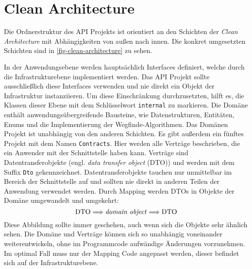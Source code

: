 \part{Clean Architecture}
Die Ordnerstruktur des API Projekts ist orientiert an den Schichten
der \textit{Clean Architecture}
mit Abhän\-gigkeiten von außen nach innen. Die konkret umgesetzten Schichten
sind in \autoref{fig-clean-architecture} zu sehen.



\noindent
In der Anwendungsebene werden hauptsächlich Interfaces definiert, welche
durch die Infrastrukturebene implementiert werden. Das API Projekt
sollte ausschließlich diese Interfaces verwenden und nie direkt
ein Objekt der Infrastruktur instanziieren.
Um diese Einschränkung durchzusetzten, hilft es,
die Klassen dieser Ebene mit dem Schlüsselwort \texttt{internal} zu markieren.
Die Domäne enthält anwendungsübergreifende Bausteine, wie
Datenstrukturen, Entitäten, Enums und die Implementierung der Wegfinde-Algorith\-men.
Das Domänen Projekt ist unabhängig von den anderen Schichten.
Es gibt außerdem ein fünftes Projekt mit dem Namen \texttt{Contracts}. Hier
werden alle Verträge beschrieben, die ein Anwender mit der Schnittstelle
haben kann. Verträge sind Datentransferobjekte (engl. \textit{data transfer object} (DTO))
und werden mit dem Suffix \texttt{Dto} gekennzeichnet. Datentransferobjekte
tauchen nur unmittelbar im Bereich der Schnittstelle auf und
sollten nie direkt in anderen Teilen der Anwendung verwendet werden.
Durch Mapping werden DTOs in Objekte der Domäne umgewandelt und umgekehrt:
\begin{equation*}
  \text{DTO} \Longrightarrow \text{\textit{domain object}} \Longrightarrow \text{DTO}
\end{equation*}
Diese Abbildung sollte immer geschehen, auch wenn sich die Objekte
sehr ähnlich sehen.
Die Domäne und Verträge können sich so unabhängig voneinander weiterentwickeln,
ohne im Programmcode aufwändige Änderungen vorzunehmen.
Im optimal Fall muss nur der Mapping Code angepasst werden,
dieser befindet sich auf der Infrastrukturebene.